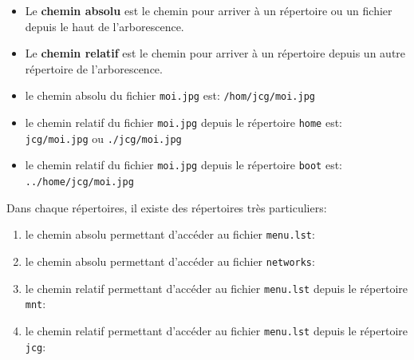 \begin{definition}{}
	\begin{itemize}
		\item Le \textbf{chemin absolu} est le chemin pour arriver à un répertoire ou un fichier depuis le haut de l'arborescence.
		\item Le \textbf{chemin relatif} est le chemin pour arriver à un répertoire depuis un autre répertoire de l'arborescence.
	\end{itemize}
\end{definition}

\begin{exemple}{}
	\begin{itemize}
		\item le chemin absolu du fichier \verb+moi.jpg+ est:		\verb+/hom/jcg/moi.jpg+
		\item le chemin relatif du fichier \verb+moi.jpg+ depuis le répertoire \verb+home+ est:		\verb+jcg/moi.jpg+ ou \verb+./jcg/moi.jpg+
		\item le chemin relatif du fichier \verb+moi.jpg+ depuis le répertoire \verb+boot+ est:	\verb+../home/jcg/moi.jpg+

	\end{itemize}
\end{exemple}

\begin{propriete}{}

	Dans chaque répertoires, il existe des répertoires très particuliers: 
\end{propriete}

\begin{exercice_cours}[Déterminer]{}
	\begin{enumerate}
		\item le chemin absolu permettant d'accéder au fichier \verb+menu.lst+: \dotfill
		\item le chemin absolu permettant d'accéder au fichier \verb+networks+: \dotfill
		\item le chemin relatif permettant d'accéder au fichier \verb+menu.lst+ depuis le répertoire \verb+mnt+: \dotfill
		\item le chemin relatif permettant d'accéder au fichier \verb+menu.lst+ depuis le répertoire \verb+jcg+: \dotfill
	\end{enumerate}
\end{exercice_cours}


